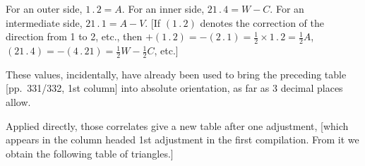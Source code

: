 \par\noindent\hspace*{\parindent}For an outer side, \(1\, .\,2=A\). For an inner side, \(21\, .\,4=W-C\). For
an intermediate side, \(21\, .\,1=A-V\). [If \((1\, .\,2)\) denotes the correction of the
direction from 1 to 2, etc., then \(+(1\, .\,2)=-(2\, .\,1)=\frac12\times1\, .\,2=\frac12A\),
\((21\, .\,4)=-(4\, .\,21)=\frac12W-\frac12C\), etc.]

\par\noindent\hspace*{\parindent}These values, incidentally, have already been used to bring the preceding
table [pp.\ 331/332, 1st column] into absolute orientation,
as far as 3 decimal places allow.

\par\noindent\hspace*{\parindent}Applied directly, those correlates give a new table after one adjustment,
[which appears in the column headed \guillemotright{}1st adjustment\guillemotleft{}
in the first compilation. From it we obtain the following table of triangles.]
